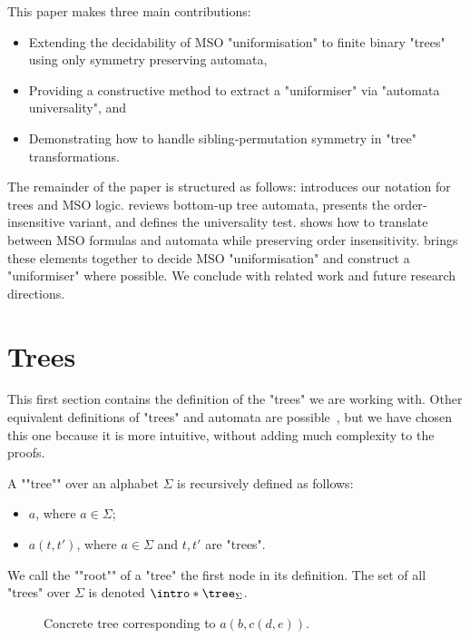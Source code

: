 \documentclass[twoside]{article}
\begin{document}
This paper makes three main contributions:
\begin{itemize}
	\item Extending the decidability of MSO "uniformisation" to finite binary "trees" using only symmetry preserving automata,
	\item Providing a constructive method to extract a "uniformiser" via "automata universality", and
	\item Demonstrating how to handle sibling‐permutation symmetry in "tree" transformations.
\end{itemize}

The remainder of the paper is structured as follows:
 introduces our notation for trees and MSO logic.
 reviews bottom‐up tree automata, presents the order‐insensitive variant, and defines the universality test.
 shows how to translate between MSO formulas and automata while preserving order insensitivity.
 brings these elements together to decide MSO "uniformisation" and construct a "uniformiser" where possible.
We conclude with related work and future research directions.


\section{Trees}\label{sec:trees}

This first section contains the definition of the "trees" we are working with. Other equivalent definitions of "trees" and
automata are possible~\cite{Thomas1997, tata}, but we have chosen this one because it is more intuitive, without adding much complexity to the proofs.

\begin{definition}["Tree"]
	\AP A ""tree"" over an alphabet $\Sigma$ is recursively defined as follows:
	\begin{itemize}
		\item $a$, where $a \in \Sigma$;
		\item $a(t,t')$, where $a \in \Sigma$ and $t, t'$ are "trees".
	\end{itemize}
	We call the ""root"" of a "tree" the first node in its definition.
	The set of all "trees" over $\Sigma$ is denoted $\intro* \tree_{\Sigma}$.
\end{definition}

\begin{figure}[h]
	\centering


	\caption{Concrete tree corresponding to $a(b, c(d, e))$.}
\end{figure}
\end{document}

